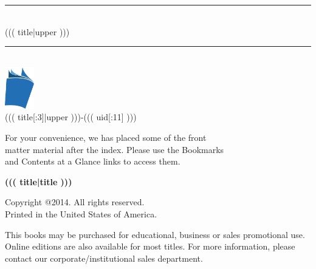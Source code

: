 \documentclass{article}
\newcommand{\HRule}{\rule{\linewidth}{1mm}}
\begin{document}
\begin{titlepage}

\pagecolor{titlepagecolor}
\color{white}

\begin{flushright}
\textcolor{white}{ }

\vspace{7cm}

\HRule \\[0.4cm]
{\large ((( title|upper ))) }\\[0.4cm]
\HRule \\[2.5cm]

\includegraphics[height=18mm]{book-icon.png} \\[2mm]
\scriptsize{ ((( title[:3]|upper )))-((( uid[:11] ))) }

\end{flushright}

\vfill

\begin{flushright}
\footnotesize{ For your convenience, we has placed some of the front \\
matter material after the index. Please use the Bookmarks \\
and Contents at a Glance links to access them. }
\end{flushright}

\end{titlepage}

\nopagecolor %

\noindent
{\textbf {\footnotesize ((( title|title ))) }}

\vspace{6pt}

\noindent
\scriptsize{Copyright @2014. All rights reserved. \\Printed in the United
  States of America.}

\noindent
\scriptsize{This books may be purchased for educational, business or
  sales promotional use. Online editions are also available for most
  titles. For more information, please contact our
  corporate/institutional sales department.}
\end{document}
